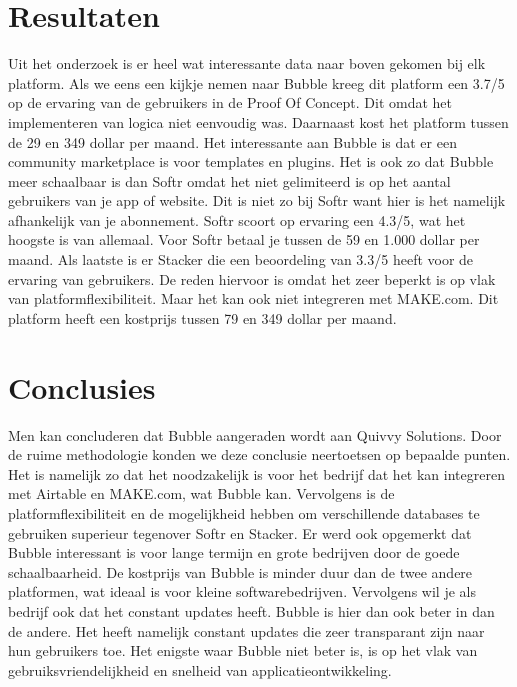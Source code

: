 \documentclass[a0,portrait]{hogent-poster}
\begin{document}
\begin{multicols}{2}


\section{Resultaten}
Uit het onderzoek is er heel wat interessante data naar boven gekomen bij elk platform. 
Als we eens een kijkje nemen naar Bubble kreeg dit platform een 3.7/5 op de ervaring van de gebruikers in de Proof Of Concept. 
Dit omdat het implementeren van logica niet eenvoudig was. Daarnaast kost het platform tussen de 29 en 349 dollar per maand. 
Het interessante aan Bubble is dat er een community marketplace is voor templates en plugins. Het is ook zo dat Bubble meer schaalbaar 
is dan Softr omdat het niet gelimiteerd is op het aantal gebruikers van je app of website. Dit is niet zo bij Softr want hier is het namelijk 
afhankelijk van je abonnement. Softr scoort op ervaring een 4.3/5, wat het hoogste is van allemaal. Voor Softr betaal je tussen de 59 en 
1.000 dollar per maand. Als laatste is er Stacker die een beoordeling van 3.3/5 heeft voor de ervaring van gebruikers. 
De reden hiervoor is omdat het zeer beperkt is op vlak van platformflexibiliteit. Maar het kan ook niet integreren met MAKE.com. 
Dit platform heeft een kostprijs tussen 79 en 349 dollar per maand.
\section{Conclusies}
Men kan concluderen dat Bubble aangeraden wordt aan Quivvy Solutions. 
Door de ruime methodologie konden we deze conclusie neertoetsen op bepaalde punten. 
Het is namelijk zo dat het noodzakelijk is voor het bedrijf dat het kan integreren met Airtable en MAKE.com, 
wat Bubble kan. Vervolgens is de platformflexibiliteit en de mogelijkheid hebben om verschillende databases te 
gebruiken superieur tegenover Softr en Stacker. Er werd ook opgemerkt dat Bubble interessant is voor lange termijn en 
grote bedrijven door de goede schaalbaarheid. De kostprijs van Bubble is minder duur dan de twee andere platformen, 
wat ideaal is voor kleine softwarebedrijven. Vervolgens wil je als bedrijf ook dat het constant updates heeft. Bubble is 
hier dan ook beter in dan de andere. Het heeft namelijk constant updates die zeer transparant zijn naar hun gebruikers 
toe. Het enigste waar Bubble niet beter is, is op het vlak van gebruiksvriendelijkheid en snelheid van applicatieontwikkeling.


\end{multicols}
\end{document}
